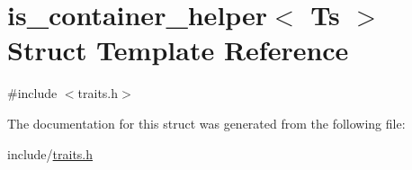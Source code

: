 \hypertarget{structis__container__helper}{\section{is\-\_\-container\-\_\-helper$<$ Ts $>$ Struct Template Reference}
\label{structis__container__helper}
}


{\ttfamily \#include $<$traits.\-h$>$}



The documentation for this struct was generated from the following file\-:\begin{DoxyCompactItemize}
\item 
include/\hyperlink{traits_8h}{traits.\-h}\end{DoxyCompactItemize}
